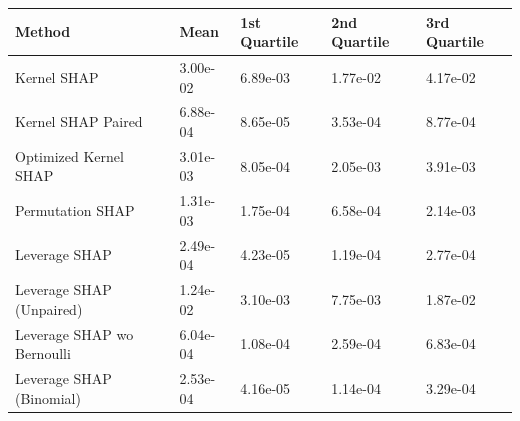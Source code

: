 \begin{tabular}{lllll}
  \toprule
  \textbf{Method} & \textbf{Mean} & \textbf{1st Quartile} & \textbf{2nd Quartile} & \textbf{3rd Quartile} \\ \midrule
Kernel SHAP & 3.00e-02 & 6.89e-03 & 1.77e-02 & 4.17e-02\\
Kernel SHAP Paired & 6.88e-04 & \cellcolor{bronze!60}8.65e-05 & 3.53e-04 & 8.77e-04\\
Optimized Kernel SHAP & 3.01e-03 & 8.05e-04 & 2.05e-03 & 3.91e-03\\
Permutation SHAP & 1.31e-03 & 1.75e-04 & 6.58e-04 & 2.14e-03\\
Leverage SHAP & \cellcolor{gold!60}2.49e-04 & \cellcolor{silver!60}4.23e-05 & \cellcolor{silver!60}1.19e-04 & \cellcolor{gold!60}2.77e-04\\
Leverage SHAP (Unpaired) & 1.24e-02 & 3.10e-03 & 7.75e-03 & 1.87e-02\\
Leverage SHAP wo Bernoulli & \cellcolor{bronze!60}6.04e-04 & 1.08e-04 & \cellcolor{bronze!60}2.59e-04 & \cellcolor{bronze!60}6.83e-04\\
Leverage SHAP (Binomial) & \cellcolor{silver!60}2.53e-04 & \cellcolor{gold!60}4.16e-05 & \cellcolor{gold!60}1.14e-04 & \cellcolor{silver!60}3.29e-04\\
\bottomrule
\end{tabular}
